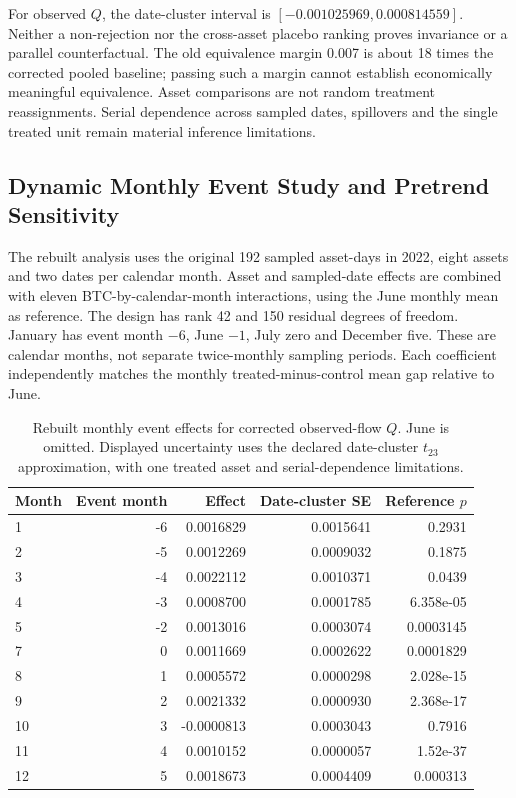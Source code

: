 For observed $Q$, the date-cluster interval is $[-0.001025969,0.000814559]$. Neither a non-rejection nor the cross-asset placebo ranking proves invariance or a parallel counterfactual. The old equivalence margin 0.007 is about 18 times the corrected pooled baseline; passing such a margin cannot establish economically meaningful equivalence. Asset comparisons are not random treatment reassignments. Serial dependence across sampled dates, spillovers and the single treated unit remain material inference limitations.
\subsection{Dynamic Monthly Event Study and Pretrend Sensitivity}
The rebuilt analysis uses the original 192 sampled asset-days in 2022, eight assets and two dates per calendar month. Asset and sampled-date effects are combined with eleven BTC-by-calendar-month interactions, using the June monthly mean as reference. The design has rank 42 and 150 residual degrees of freedom. January has event month $-6$, June $-1$, July zero and December five. These are calendar months, not separate twice-monthly sampling periods. Each coefficient independently matches the monthly treated-minus-control mean gap relative to June.

\begin{table}[htbp]
\centering\footnotesize
\caption{Rebuilt monthly event effects for corrected observed-flow $Q$. June is omitted. Displayed uncertainty uses the declared date-cluster $t_{23}$ approximation, with one treated asset and serial-dependence limitations.}
\label{tab:dynamic_event_study}
\begin{tabular}{lrrrr}\toprule
Month & Event month & Effect & Date-cluster SE & Reference $p$ \\\midrule
1 & -6 & 0.0016829 & 0.0015641 & 0.2931 \\
2 & -5 & 0.0012269 & 0.0009032 & 0.1875 \\
3 & -4 & 0.0022112 & 0.0010371 & 0.0439 \\
4 & -3 & 0.0008700 & 0.0001785 & 6.358e-05 \\
5 & -2 & 0.0013016 & 0.0003074 & 0.0003145 \\
7 & 0 & 0.0011669 & 0.0002622 & 0.0001829 \\
8 & 1 & 0.0005572 & 0.0000298 & 2.028e-15 \\
9 & 2 & 0.0021332 & 0.0000930 & 2.368e-17 \\
10 & 3 & -0.0000813 & 0.0003043 & 0.7916 \\
11 & 4 & 0.0010152 & 0.0000057 & 1.52e-37 \\
12 & 5 & 0.0018673 & 0.0004409 & 0.000313 \\
\bottomrule\end{tabular}
\end{table}

